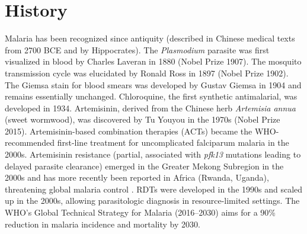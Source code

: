 \section*{History}
Malaria has been recognized since antiquity (described in Chinese medical texts from 2700 BCE and by Hippocrates). The \textit{Plasmodium} parasite was first visualized in blood by Charles Laveran in 1880 (Nobel Prize 1907). The mosquito transmission cycle was elucidated by Ronald Ross in 1897 (Nobel Prize 1902). The Giemsa stain for blood smears was developed by Gustav Giemsa in 1904 and remains essentially unchanged. Chloroquine, the first synthetic antimalarial, was developed in 1934. Artemisinin, derived from the Chinese herb \textit{Artemisia annua} (sweet wormwood), was discovered by Tu Youyou in the 1970s (Nobel Prize 2015). Artemisinin-based combination therapies (ACTs) became the WHO-recommended first-line treatment for uncomplicated falciparum malaria in the 2000s. Artemisinin resistance (partial, associated with \textit{pfk13} mutations leading to delayed parasite clearance) emerged in the Greater Mekong Subregion in the 2000s and has more recently been reported in Africa (Rwanda, Uganda), threatening global malaria control \cite{ashley2014spread}. RDTs were developed in the 1990s and scaled up in the 2000s, allowing parasitologic diagnosis in resource-limited settings. The WHO's Global Technical Strategy for Malaria (2016--2030) aims for a 90\% reduction in malaria incidence and mortality by 2030.

